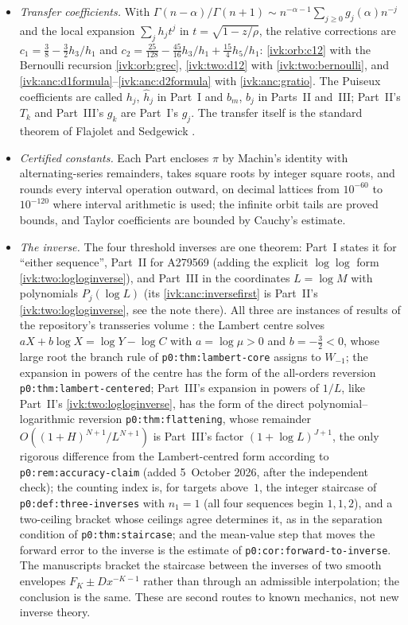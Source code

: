 \documentclass[11pt,letterpaper]{article}
\theoremstyle{remark}\newtheorem{remark}[theorem]{Remark}
\begin{document}
\begin{itemize}
\item \emph{Transfer coefficients.} With $\Gamma(n-\alpha)/\Gamma(n+1)\sim n^{-\alpha-1}\sum_{j\ge0}g_j(\alpha)n^{-j}$ and the local expansion $\sum_jh_jt^j$ in $t=\sqrt{1-z/\rho}$, the relative corrections are $c_1=\frac38-\frac32h_3/h_1$ and $c_2=\frac{25}{128}-\frac{45}{16}h_3/h_1+\frac{15}{4}h_5/h_1$: \eqref{ivk:orb:c12} with the Bernoulli recursion \eqref{ivk:orb:grec}, \eqref{ivk:two:d12} with \eqref{ivk:two:bernoulli}, and \eqref{ivk:anc:d1formula}--\eqref{ivk:anc:d2formula} with \eqref{ivk:anc:gratio}. The Puiseux coefficients are called $h_j$, $\widehat h_j$ in Part~I and $b_m$, $b_j$ in Parts~II and~III; Part~II's $T_k$ and Part~III's $g_k$ are Part~I's $g_j$. The transfer itself is the standard theorem of Flajolet and Sedgewick \cite[Chapter VI]{fs}.
\item \emph{Certified constants.} Each Part encloses $\pi$ by Machin's identity with alternating-series remainders, takes square roots by integer square roots, and rounds every interval operation outward, on decimal lattices from $10^{-60}$ to $10^{-120}$ where interval arithmetic is used; the infinite orbit tails are proved bounds, and Taylor coefficients are bounded by Cauchy's estimate.
\item \emph{The inverse.} The four threshold inverses are one theorem: Part~I states it for ``either sequence'', Part~II for A279569 (adding the explicit $\log\log$ form \eqref{ivk:two:logloginverse}), and Part~III in the coordinates $L=\log M$ with polynomials $P_j(\log L)$ (its \eqref{ivk:anc:inversefirst} is Part~II's \eqref{ivk:two:logloginverse}, see the note there). All three are instances of results of the repository's transseries volume \cite{tsvol}: the Lambert centre solves $aX+b\log X=\log Y-\log C$ with $a=\log\mu>0$ and $b=-\frac32<0$, whose large root the branch rule of \texttt{p0:thm:lambert-core} assigns to $W_{-1}$; the expansion in powers of the centre has the form of the all-orders reversion \texttt{p0:thm:lambert-centered}; Part~III's expansion in powers of $1/L$, like Part~II's \eqref{ivk:two:logloginverse}, has the form of the direct polynomial--logarithmic reversion \texttt{p0:thm:flattening}, whose remainder $O((1+H)^{N+1}/L^{N+1})$ is Part~III's factor $(1+\log L)^{J+1}$, the only rigorous difference from the Lambert-centred form according to \texttt{p0:rem:accuracy-claim} (added 5~October 2026, after the independent check); the counting index is, for targets above~$1$, the integer staircase of \texttt{p0:def:three-inverses} with $n_1=1$ (all four sequences begin $1,1,2$), and a two-ceiling bracket whose ceilings agree determines it, as in the separation condition of \texttt{p0:thm:staircase}; and the mean-value step that moves the forward error to the inverse is the estimate of \texttt{p0:cor:forward-to-inverse}. The manuscripts bracket the staircase between the inverses of two smooth envelopes $F_K\pm Dx^{-K-1}$ rather than through an admissible interpolation; the conclusion is the same. These are second routes to known mechanics, not new inverse theory.
\end{itemize}
\end{document}
